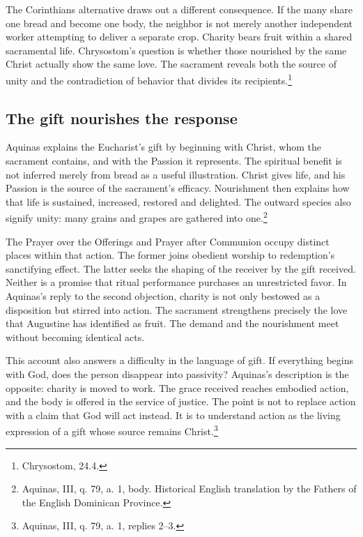 The Corinthians alternative draws out a different consequence. If the many share one bread and become one body, the neighbor is not merely another independent worker attempting to deliver a separate crop. Charity bears fruit within a shared sacramental life. Chrysostom's question is whether those nourished by the same Christ actually show the same love. The sacrament reveals both the source of unity and the contradiction of behavior that divides its recipients.\footnote{Chrysostom,  24.4.}

\subsection{The gift nourishes the response}
Aquinas explains the Eucharist's gift by beginning with Christ, whom the sacrament contains, and with the Passion it represents. The spiritual benefit is not inferred merely from bread as a useful illustration. Christ gives life, and his Passion is the source of the sacrament's efficacy. Nourishment then explains how that life is sustained, increased, restored and delighted. The outward species also signify unity: many grains and grapes are gathered into one.\footnote{Aquinas,  III, q. 79, a. 1, body. Historical English translation by the Fathers of the English Dominican Province.}

The Prayer over the Offerings and Prayer after Communion occupy distinct places within that action. The former joins obedient worship to redemption's sanctifying effect. The latter seeks the shaping of the receiver by the gift received. Neither is a promise that ritual performance purchases an unrestricted favor. In Aquinas's reply to the second objection, charity is not only bestowed as a disposition but stirred into action. The sacrament strengthens precisely the love that Augustine has identified as fruit. The demand and the nourishment meet without becoming identical acts.

This account also answers a difficulty in the language of gift. If everything begins with God, does the person disappear into passivity? Aquinas's description is the opposite: charity is moved to work. The grace received reaches embodied action, and the body is offered in the service of justice. The point is not to replace action with a claim that God will act instead. It is to understand action as the living expression of a gift whose source remains Christ.\footnote{Aquinas, III, q. 79, a. 1, replies 2--3.}

